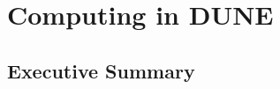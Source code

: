 \chapter{Computing in DUNE}
\label{ch:exec-comp}
%
%
%
%
%
%
\section{Executive Summary}
\label{ch:exec-comp-es}

